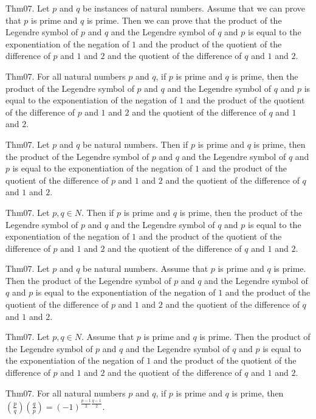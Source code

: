 \documentclass{article}
\begin{document}
Thm07. Let $p$ and $q$ be instances of natural numbers. Assume that we can prove that $p$ is prime and $q$ is prime. Then we can prove that the product of the Legendre symbol of $p$ and $q$ and the Legendre symbol of $q$ and $p$ is equal to the exponentiation of the negation of $1$ and the product of the quotient of the difference of $p$ and $1$ and $2$ and the quotient of the difference of $q$ and $1$ and $2$.

Thm07. For all natural numbers $p$ and $q$, if $p$ is prime and $q$ is prime, then the product of the Legendre symbol of $p$ and $q$ and the Legendre symbol of $q$ and $p$ is equal to the exponentiation of the negation of $1$ and the product of the quotient of the difference of $p$ and $1$ and $2$ and the quotient of the difference of $q$ and $1$ and $2$.

Thm07. Let $p$ and $q$ be natural numbers. Then if $p$ is prime and $q$ is prime, then the product of the Legendre symbol of $p$ and $q$ and the Legendre symbol of $q$ and $p$ is equal to the exponentiation of the negation of $1$ and the product of the quotient of the difference of $p$ and $1$ and $2$ and the quotient of the difference of $q$ and $1$ and $2$.

Thm07. Let $p , q \in N$. Then if $p$ is prime and $q$ is prime, then the product of the Legendre symbol of $p$ and $q$ and the Legendre symbol of $q$ and $p$ is equal to the exponentiation of the negation of $1$ and the product of the quotient of the difference of $p$ and $1$ and $2$ and the quotient of the difference of $q$ and $1$ and $2$.

Thm07. Let $p$ and $q$ be natural numbers. Assume that $p$ is prime and $q$ is prime. Then the product of the Legendre symbol of $p$ and $q$ and the Legendre symbol of $q$ and $p$ is equal to the exponentiation of the negation of $1$ and the product of the quotient of the difference of $p$ and $1$ and $2$ and the quotient of the difference of $q$ and $1$ and $2$.

Thm07. Let $p , q \in N$. Assume that $p$ is prime and $q$ is prime. Then the product of the Legendre symbol of $p$ and $q$ and the Legendre symbol of $q$ and $p$ is equal to the exponentiation of the negation of $1$ and the product of the quotient of the difference of $p$ and $1$ and $2$ and the quotient of the difference of $q$ and $1$ and $2$.

Thm07. For all natural numbers $p$ and $q$, if $p$ is prime and $q$ is prime, then $\left(\frac{ p }{ q }\right) \left(\frac{ q }{ p }\right) = (- 1)^ {\frac{ p - 1}{2}\frac{ q - 1}{2}}$.
\end{document}
